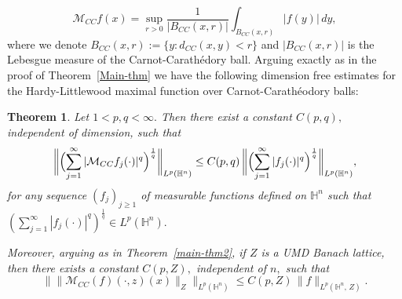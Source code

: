 \documentclass[11pt]{amsart}
\newcommand{\Ha}{\mathbb{H}^n}
\newtheorem{theorem}{Theorem}[section]
\theoremstyle{definition}
\numberwithin{equation}{section}
\begin{document}
\[\mathcal{M}_{CC}f(x)=\sup_{r>0}\frac{1}{|B_{CC}(x, r)|}\int_{B_{CC}(x, r)}|f(y)|\, dy,\]
where we denote $B_{CC}(x, r):=\{y: d_{CC}(x, y)<r\}$ and $|B_{CC}(x, r)|$ is the Lebesgue measure of the Carnot-Carath\'edory ball. Arguing exactly as in the proof of Theorem~\ref{Main-thm} we have the following dimension free estimates for the Hardy-Littlewood maximal function over Carnot-Carath\'eodory balls:
\begin{theorem}
\label{Main-thm-CC}
Let $1<p, q<\infty.$ Then there exist a constant $C(p, q),$ independent of dimension, such that
\[
\biggl\|\Bigl(\sum_{j=1}^{\infty}|\mathcal{M}_{CC}f_j(\cdot)|^q\Bigr)^\frac{1}{q}\biggr\|_{L^p(\Ha)}\leq C(p, q)\, \biggl\|\Bigl(\sum_{j=1}^{\infty}|f_j(\cdot)|^q\Bigr)^\frac{1}{q}\biggr\|_{L^p(\Ha)},
\]
for any  sequence $(f_j)_{j\geq 1}$  of measurable functions defined on $\mathbb{H}^n$ such that $\left(\sum_{j=1}^\infty|f_j(\cdot)|^q\right)^{\frac1q}\in L^p(\mathbb{H}^n).$

Moreover, arguing as in Theorem~\ref{main-thm2}, if $Z$ is a UMD Banach lattice, then there exists a constant $C(p, Z),$ independent of $n,$ such that
$$\bigg\| \big\|\mathcal{M}_{CC}(f)(\cdot, z)(x)\big\|_{Z}\bigg\|_{L^p(\Ha)}\leq C(p, Z)\, \|f\|_{L^p(\Ha,\, Z)}.$$
\end{theorem}
\end{document}
